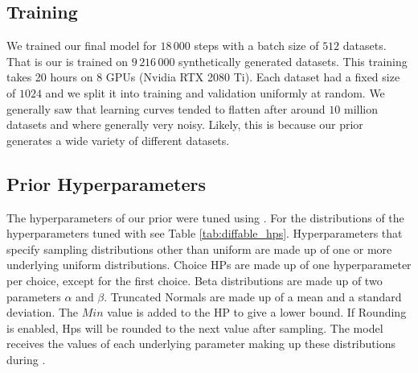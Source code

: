\documentclass{article}
\begin{document}
\subsection{\methodname{} Training}
We trained our final model for $18\,000$ steps with a batch size of $512$ datasets. That is our \methodname{} is trained on $9\,216\,000$ synthetically generated datasets. This training takes 20 hours on 8 GPUs (Nvidia RTX 2080 Ti). Each dataset had a fixed size of $1024$ and we split it into training and validation uniformly at random. We generally saw that learning curves tended to flatten after around $10$ million datasets and where generally very noisy. Likely, this is because our prior generates a wide variety of different datasets.

\subsection{Prior Hyperparameters}
The hyperparameters of our prior were tuned using \priortuning{}. For the distributions of the hyperparameters tuned with \priortuning{} see Table \ref{tab:diffable_hps}. Hyperparameters that specify sampling distributions other than uniform are made up of one or more underlying uniform distributions. Choice HPs are made up of one hyperparameter per choice, except for the first choice. Beta distributions are made up of two parameters $\alpha$ and $\beta$. Truncated Normals are made up of a mean and a standard deviation. The $Min$ value is added to the HP to give a lower bound. If Rounding is enabled, Hps will be rounded to the next value after sampling. The model receives the values of each underlying parameter making up these distributions during \priortuning{}.
\end{document}
